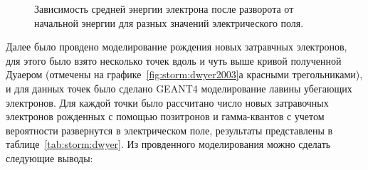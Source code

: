\begin{figure}[ph!]
    \begin{center}
        \begin{minipage}[h]{0.49\linewidth}
        \end{minipage}
        \hfill
        \begin{minipage}[h]{0.49\linewidth}
        \end{minipage}    
        \vfill
        \begin{minipage}[h]{0.49\linewidth}
        \end{minipage}
        \hfill
        \begin{minipage}[h]{0.49\linewidth}
        \end{minipage} 
        \vfill
        \begin{minipage}[h]{0.49\linewidth}
        \end{minipage}
        \caption{Зависимость средней энергии электрона после разворота от начальной энергии для разных значений электрического поля.}
    \end{center}
    \label{fig:storm:reverse_energy_nc_2}
\end{figure}
Далее было провдено моделирование рождения новых затравчных электронов, для этого было взято несколько точек вдоль и чуть выше кривой полученной Дуаером (отмечены на графике~\ref{fig:storm:dwyer2003}а красными трегольниками), и для данных точек было сделано GEANT4 моделирование лавины убегающих электронов.  Для каждой точки было рассчитано число новых затравочных электронов рожденных с помощью позитронов и гамма-квантов с учетом вероятности развернутся в электрическом поле, результаты представлены в таблице~\ref{tab:storm:dwyer}. Из провденного моделирования можно сделать следующие выводы:
